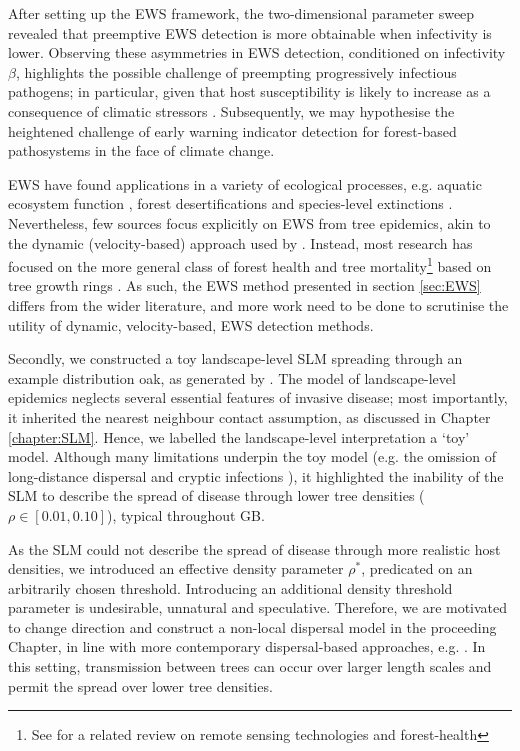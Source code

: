 After setting up the EWS framework, the two-dimensional parameter sweep revealed that preemptive EWS detection is more obtainable 
when infectivity is lower. Observing these asymmetries in EWS detection, conditioned on infectivity
$\beta$, highlights the possible challenge of preempting progressively infectious pathogens;
in particular, given that host susceptibility is likely to increase as a consequence of climatic stressors \cite{garrett2006climate}.
Subsequently, we may hypothesise the heightened challenge of early warning indicator detection for forest-based pathosystems in the face of climate change.

EWS have found applications in a variety of ecological processes, 
e.g. aquatic ecosystem function \cite{kramer1991aquatic}, forest desertifications \cite{yang2005desertification}
and species-level extinctions \cite{drake2010early}.
Nevertheless, few sources focus explicitly on EWS from tree epidemics, akin to the dynamic (velocity-based) 
approach used by \cite{OROZCOFUENTES201912}. Instead, most research has focused on the more general class of forest
health and tree mortality\footnote{ 
See \cite{torres2021role} for a related review on remote sensing technologies and forest-health
} based on tree growth rings \cite{rogers2018detecting, mamet2015tree}. 
As such, the EWS method presented in section \ref{sec:EWS} differs from the wider literature,
and more work need to be done to scrutinise the utility of dynamic, velocity-based, EWS detection methods.

Secondly, we constructed a toy landscape-level SLM spreading through an example distribution oak, as generated by \cite{hill.data}.
The model of landscape-level epidemics neglects several essential features of invasive disease; most importantly, 
it inherited the nearest neighbour contact assumption, as discussed in Chapter \ref{chapter:SLM}.
Hence, we labelled the landscape-level interpretation a `toy' model.
Although many limitations underpin the toy model (e.g. the omission of long-distance dispersal \cite{long-range-dispersal}
and cryptic infections \cite{gilligan2007impact}), it highlighted the inability of the SLM to describe the spread of disease
through lower tree densities ($\rho \in [0.01, 0.10]$), typical throughout GB.

As the SLM could not describe the spread of disease through more realistic host densities, 
we introduced an effective density parameter $\rho^*$, predicated on an arbitrarily chosen threshold.
Introducing an additional density threshold parameter is undesirable, unnatural and speculative.
Therefore, we are motivated to change direction and construct a non-local dispersal model in the proceeding Chapter, in line with more contemporary dispersal-based approaches, e.g. \cite{parnell2009optimal, meentemeyer2011epidemiological}.
In this setting, transmission between trees can occur over larger length scales and permit the spread over lower tree densities. 

